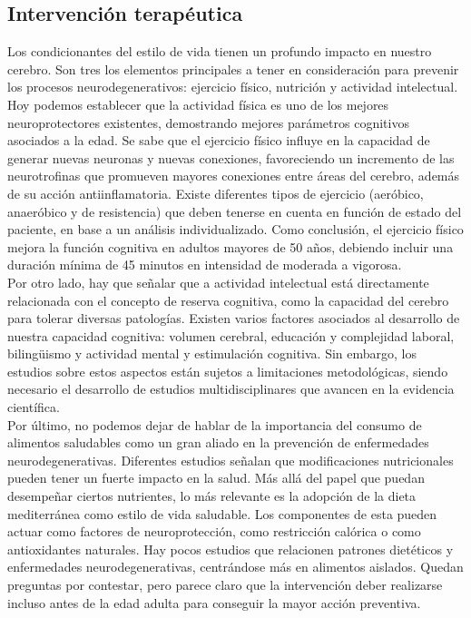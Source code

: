 \documentclass[12pt]{article}
\begin{document}
	\subsection{Intervención terapéutica}

	Los condicionantes del estilo de vida tienen un profundo impacto en nuestro cerebro. Son tres los elementos principales a tener en consideración para prevenir los procesos neurodegenerativos: ejercicio físico, nutrición y actividad intelectual.\\
	
	Hoy podemos establecer que la actividad física es uno de los mejores neuroprotectores existentes, demostrando mejores parámetros cognitivos asociados a la edad. Se sabe que el ejercicio físico influye en la capacidad de generar nuevas neuronas y nuevas conexiones, favoreciendo un incremento de las neurotrofinas que promueven mayores conexiones entre áreas del cerebro, además de su acción antiinflamatoria. Existe diferentes tipos de ejercicio (aeróbico, anaeróbico y de resistencia) que deben tenerse en cuenta en función de estado del paciente, en base a un análisis individualizado. Como conclusión, el ejercicio físico mejora la función cognitiva en adultos mayores de 50 años, debiendo incluir una duración mínima de 45 minutos en intensidad de moderada a vigorosa.\\
	
	Por otro lado, hay que señalar que a actividad intelectual está directamente relacionada con el concepto de reserva cognitiva, como la capacidad del cerebro para tolerar diversas patologías. Existen varios factores asociados al desarrollo de nuestra capacidad cognitiva: volumen cerebral, educación y complejidad laboral, bilingüismo y actividad mental y estimulación cognitiva. Sin embargo, los estudios sobre estos aspectos están sujetos a limitaciones metodológicas, siendo necesario el desarrollo de estudios multidisciplinares que avancen en la evidencia científica.\\
	
	Por último, no podemos dejar de hablar de la importancia del consumo de alimentos saludables como un gran aliado en la prevención de enfermedades neurodegenerativas. Diferentes estudios señalan que modificaciones nutricionales pueden tener un fuerte impacto en la salud. Más allá del papel que puedan desempeñar ciertos nutrientes, lo más relevante es la adopción de la dieta mediterránea como estilo de vida saludable. Los componentes de esta pueden actuar como factores de neuroprotección, como restricción calórica o como antioxidantes naturales. Hay pocos estudios que relacionen patrones dietéticos y enfermedades neurodegenerativas, centrándose más en alimentos aislados. Quedan preguntas por contestar, pero parece claro que la intervención deber realizarse incluso antes de la edad adulta para conseguir la mayor acción preventiva.
	
\end{document}
